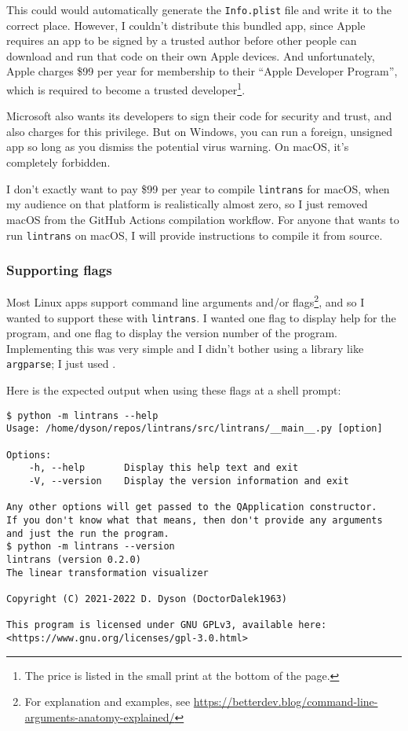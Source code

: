 \documentclass[../development.tex]{subfiles}
\begin{document}

This could would automatically generate the \texttt{Info.plist} file and write it to the correct place. However, I couldn't distribute this bundled app, since Apple requires an app to be signed by a trusted author before other people can download and run that code on their own Apple devices\cite{apple-about-code-signing}. And unfortunately, Apple charges \$99 per year for membership to their \enquote{Apple Developer Program}, which is required to become a trusted developer\cite{apple-developer-program-enrollment}\footnote{The price is listed in the small print at the bottom of the page.}.

Microsoft also wants its developers to sign their code for security and trust, and also charges for this privilege. But on Windows, you can run a foreign, unsigned app so long as you dismiss the potential virus warning. On macOS, it's completely forbidden.

I don't exactly want to pay \$99 per year to compile \texttt{lintrans} for macOS, when my audience on that platform is realistically almost zero, so I just removed macOS from the GitHub Actions compilation workflow. For anyone that wants to run \texttt{lintrans} on macOS, I will provide instructions to compile it from source.

\subsubsection{Supporting flags\label{development:preparing-for-v0.2.1:supporting-flags}}

Most Linux apps support command line arguments and/or flags\footnote{For explanation and examples, see \url{https://betterdev.blog/command-line-arguments-anatomy-explained/}}, and so I wanted to support these with \texttt{lintrans}. I wanted one flag to display help for the program, and one flag to display the version number of the program. Implementing this was very simple and I didn't bother using a library like \texttt{argparse}; I just used .


Here is the expected output when using these flags at a shell prompt:

\begin{verbatim}
$ python -m lintrans --help
Usage: /home/dyson/repos/lintrans/src/lintrans/__main__.py [option]

Options:
    -h, --help       Display this help text and exit
    -V, --version    Display the version information and exit

Any other options will get passed to the QApplication constructor.
If you don't know what that means, then don't provide any arguments and just the run the program.
$ python -m lintrans --version
lintrans (version 0.2.0)
The linear transformation visualizer

Copyright (C) 2021-2022 D. Dyson (DoctorDalek1963)

This program is licensed under GNU GPLv3, available here:
<https://www.gnu.org/licenses/gpl-3.0.html>
\end{verbatim}
\end{document}
